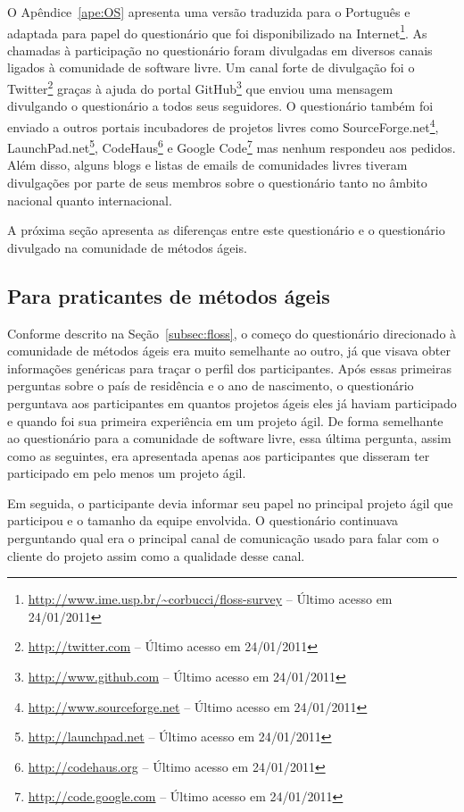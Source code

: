 O Apêndice~\ref{ape:OS} apresenta uma versão traduzida para o
Português e adaptada para papel do questionário que foi
disponibilizado na
Internet\footnote{\url{http://www.ime.usp.br/~corbucci/floss-survey}
  -- Último acesso em 24/01/2011}. As chamadas à participação no
questionário foram divulgadas em diversos canais ligados à comunidade
de software livre. Um canal forte de divulgação foi o
Twitter\footnote{\url{http://twitter.com} -- Último acesso em
  24/01/2011} graças à ajuda do portal
GitHub\footnote{\url{http://www.github.com} -- Último acesso em
  24/01/2011} que enviou uma mensagem divulgando o questionário a
todos seus seguidores. O questionário também foi enviado a outros
portais incubadores de projetos livres como
SourceForge.net\footnote{\url{http://www.sourceforge.net} -- Último
  acesso em 24/01/2011},
LaunchPad.net\footnote{\url{http://launchpad.net} -- Último acesso em
  24/01/2011}, CodeHaus\footnote{\url{http://codehaus.org} -- Último
  acesso em 24/01/2011} e Google
Code\footnote{\url{http://code.google.com} -- Último acesso em
  24/01/2011} mas nenhum respondeu aos pedidos. Além disso, alguns
blogs e listas de emails de comunidades livres tiveram divulgações por
parte de seus membros sobre o questionário tanto no âmbito nacional
quanto internacional.

A próxima seção apresenta as diferenças entre este questionário e o
questionário divulgado na comunidade de métodos ágeis.

\subsection{Para praticantes de métodos ágeis}
\label{subsec:agile}

Conforme descrito na Seção~\ref{subsec:floss}, o começo do
questionário direcionado à comunidade de métodos ágeis era muito
semelhante ao outro, já que visava obter informações genéricas para
traçar o perfil dos participantes.  Após essas primeiras perguntas
sobre o país de residência e o ano de nascimento, o questionário
perguntava aos participantes em quantos projetos ágeis eles já haviam
participado e quando foi sua primeira experiência em um projeto ágil.
De forma semelhante ao questionário para a comunidade de software
livre, essa última pergunta, assim como as seguintes, era apresentada
apenas aos participantes que disseram ter participado em pelo menos um
projeto ágil.

Em seguida, o participante devia informar seu papel no principal
projeto ágil que participou e o tamanho da equipe envolvida. O
questionário continuava perguntando qual era o principal canal de
comunicação usado para falar com o cliente do projeto assim como a
qualidade desse canal.

